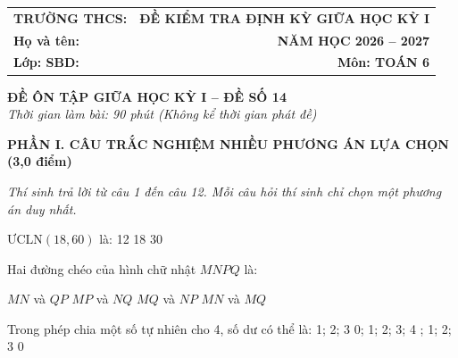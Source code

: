 \documentclass[12pt,a4paper]{article}
\begin{document}
\noindent
\begin{tabularx}{\linewidth}{X r}
\textbf{TRƯỜNG THCS: \dotfill} & \textbf{ĐỀ KIỂM TRA ĐỊNH KỲ GIỮA HỌC KỲ I} \\
\textbf{Họ và tên: \dotfill} & \textbf{NĂM HỌC 2026 -- 2027} \\
\textbf{Lớp: \dotfill \quad SBD: \dotfill} & \textbf{Môn: TOÁN 6} \\
\hline
\end{tabularx}
\vspace{2mm}

\begin{center}
  \textbf{\large ĐỀ ÔN TẬP GIỮA HỌC KỲ I -- ĐỀ SỐ 14}\\
  \textit{Thời gian làm bài: 90 phút (Không kể thời gian phát đề)}
\end{center}
\vspace{1mm}

\noindent\textbf{\large PHẦN I. CÂU TRẮC NGHIỆM NHIỀU PHƯƠNG ÁN LỰA CHỌN (3,0 điểm)}

\textit{Thí sinh trả lời từ câu 1 đến câu 12. Mỗi câu hỏi thí sinh chỉ chọn một phương án duy nhất.}

\vspace{1mm}
\begin{ex}
$\text{ƯCLN}(18, 60)$ là:
\choice
{}
{12}
{18}
{30}
\end{ex}

\begin{ex}
Hai đường chéo của hình chữ nhật $MNPQ$ là:
\begin{center}
\end{center}
\choice
{$MN$ và $QP$}
{\True $MP$ và $NQ$}
{$MQ$ và $NP$}
{$MN$ và $MQ$}
\end{ex}

\begin{ex}
Trong phép chia một số tự nhiên cho 4, số dư có thể là:
\choice
{1; 2; 3}
{0; 1; 2; 3; 4}
{; 1; 2; 3}
{0}
\end{ex}
\end{document}
